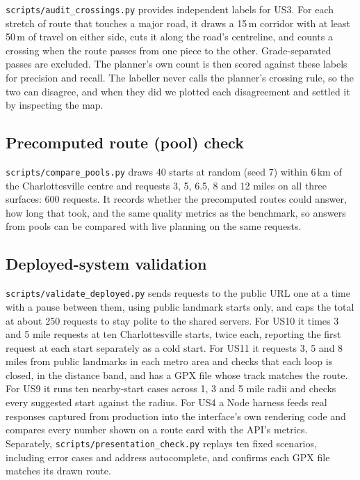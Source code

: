 \texttt{scripts/audit\_crossings.py} provides independent labels for US3. For
each stretch of route that touches a major road, it draws a 15\,m corridor
with at least 50\,m of travel on either side, cuts it along the road's
centreline, and counts a crossing when the route passes from one piece to the
other. Grade-separated passes are excluded. The planner's own count is then
scored against these labels for precision and recall. The labeller never calls
the planner's crossing rule, so the two can disagree, and when they did we
plotted each disagreement and settled it by inspecting the map.

\subsection{Precomputed route (pool) check}
\texttt{scripts/compare\_pools.py} draws 40 starts at random (seed 7) within
6\,km of the Charlottesville centre and requests 3, 5, 6.5, 8 and 12 miles on
all three surfaces: 600 requests. It records whether the precomputed routes
could answer, how long that took, and the same quality metrics as the
benchmark, so answers from pools can be compared with live planning on the
same requests.

\subsection{Deployed-system validation}
\texttt{scripts/validate\_deployed.py} sends requests to the public URL one at
a time with a pause between them, using public landmark starts only, and
caps the total at about 250 requests to stay polite to the shared servers.
For US10 it times 3 and 5 mile requests at ten Charlottesville starts, twice
each, reporting the first request at each start separately as a cold start.
For US11 it requests 3, 5 and 8 miles from public landmarks in each metro
area and checks that each loop is closed, in the distance band, and has a GPX
file whose track matches the route. For US9 it runs ten nearby-start cases
across 1, 3 and 5 mile radii and checks every suggested start against the
radius. For US4 a Node harness feeds real responses captured from production
into the interface's own rendering code and compares every number shown on a
route card with the API's metrics. Separately,
\texttt{scripts/presentation\_check.py} replays ten fixed scenarios, including
error cases and address autocomplete, and confirms each GPX file matches its
drawn route.


